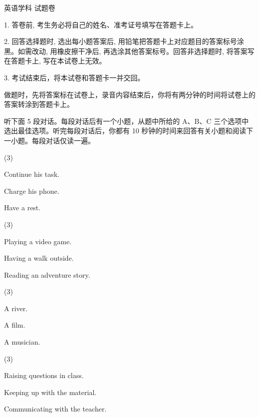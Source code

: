 \documentclass{英语试卷}
\begin{document}
\par 英语学科 试题卷\par
\begin{notice}
\par 1. 答卷前, 考生务必将自己的姓名、准考证号填写在答题卡上。\par
\par 2. 回答选择题时, 选出每小题答案后, 用铅笔把答题卡上对应题目的答案标号涂黑。如需改动, 用橡皮擦干净后, 再选涂其他答案标号。回答非选择题时, 将答案写在答题卡上, 写在本试卷上无效。\par
\par 3. 考试结束后，将本试卷和答题卡一并交回。\par
\end{notice}
\par 做题时，先将答案标在试卷上，录音内容结束后，你将有两分钟的时间将试卷上的答案转涂到答题卡上。\par
{}
\par 听下面 5 段对话。每段对话后有一个小题，从题中所给的 A、B、C 三个选项中选出最佳选项。听完每段对话后，你都有 10 秒钟的时间来回答有关小题和阅读下一小题。每段对话仅读一遍。\par
{}
\begin{choices}(3)
  \item Continue his task.
  \item Charge his phone.
  \item Have a rest.
\end{choices}
\begin{choices}(3)
  \item Playing a video game.
  \item Having a walk outside.
  \item Reading an adventure story.
\end{choices}
\begin{choices}(3)
  \item A river.
  \item A film.
  \item A musician.
\end{choices}
\begin{choices}(3)
  \item Raising questions in class.
  \item Keeping up with the material.
  \item Communicating with the teacher.
\end{choices}
\end{document}

